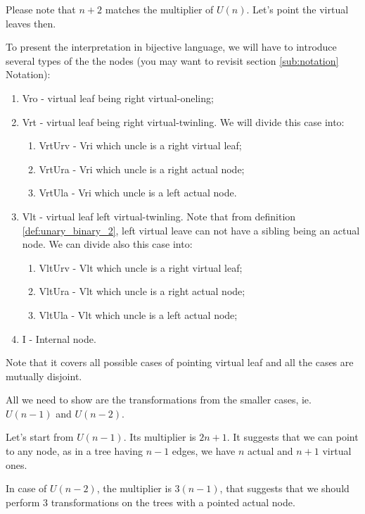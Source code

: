 \documentclass[final]{article}
\theoremstyle{definition}
\theoremstyle{remark}
\begin{document}
Please note that \(n + 2\) matches the multiplier of \(U(n)\). Let's point the virtual leaves then.

To present the interpretation in bijective language, we will have to introduce several types of the the nodes (you may want to revisit section \ref{sub:notation} Notation):

\begin{enumerate}
    \item Vro - virtual leaf being right virtual-oneling;
    \item Vrt - virtual leaf being right virtual-twinling. We will divide this case into:
        \begin{enumerate}
            \item VrtUrv - Vri which uncle is a right virtual leaf;
            \item VrtUra - Vri which uncle is a right actual node;
            \item VrtUla - Vri which uncle is a left actual node.
        \end{enumerate}
    \item Vlt - virtual leaf left virtual-twinling. Note that from definition \ref{def:unary_binary_2}, left virtual leave can not have a sibling being an actual node. We can divide also this case into:
        \begin{enumerate}
            \item VltUrv - Vlt which uncle is a right virtual leaf;
            \item VltUra - Vlt which uncle is a right actual node;
            \item VltUla - Vlt which uncle is a left actual node;
        \end{enumerate}
    \item I - Internal node.
\end{enumerate}

Note that it covers all possible cases of pointing virtual leaf and all the cases are mutually disjoint.

All we need to show are the transformations from the smaller cases, ie. \(U(n-1)\) and \(U(n-2)\).

Let's start from \(U(n-1)\). Its multiplier is \(2n + 1\). It suggests that we can point to any node, as in a tree having \(n - 1\) edges, we have \(n\) actual and \(n + 1\) virtual ones.

In case of \(U(n-2)\), the multiplier is \(3(n-1)\), that suggests that we should perform \(3\) transformations on the trees with a pointed actual node.
\end{document}
